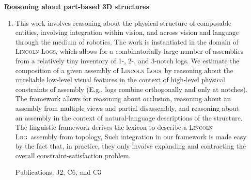 \documentclass[10pt]{article}
\newenvironment{researchBlock}[1]{%
  \vspace*{0.5ex}
  {\large \textbf{#1}}
  \begin{enumerate}\item[]}
  {\end{enumerate}}
\newcommand{\refr}[1]{{\color{RoyalBlue} #1}}
\newcommand{\LincolnLogs}{\textsc{Lincoln Logs}}
\newcommand{\LincolnLog}{\textsc{Lincoln Log}}
\begin{document}
\begin{researchBlock} {Reasoning about part-based 3D structures}
  This work involves reasoning about the physical structure of composable
  entities, involving integration within vision, and across vision and language
  through the medium of robotics.
  The work is instantiated in the domain of \LincolnLogs, which allows for a
  combinatorially large number of assemblies from a relatively tiny inventory of
  1-, 2-, and 3-notch logs.
  We estimate the composition of a given assembly of \LincolnLogs\ by reasoning
  about the unreliable low-level visual features in the context of high-level
  physical constraints of assembly (E.g., logs combine orthogonally and only at
  notches).
  The framework allows for reasoning about occlusion, reasoning about an assembly
  from multiple views and partial disassembly, and reasoning about an assembly in
  the context of natural-language descriptions of the structure.
  The linguistic framework derives the lexicon to describe a \LincolnLog\
  assembly from topology, Such integration in our framework is made easy by the
  fact that, in practice, they only involve expanding and contracting the overall
  constraint-satisfaction problem.

  Publications: \refr{J2}, \refr{C6}, and \refr{C3}

\end{researchBlock}
\end{document}
